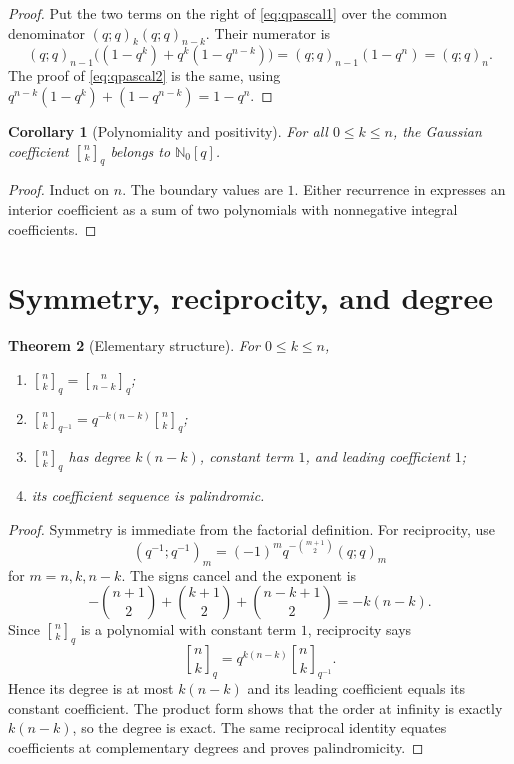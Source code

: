 \documentclass[11pt,oneside,openany]{book}
\newtheorem{theorem}{Theorem}[chapter]
\newtheorem{corollary}[theorem]{Corollary}
\theoremstyle{definition}
\theoremstyle{remark}
\newcommand{\qbinom}[2]{\genfrac{[}{]}{0pt}{}{#1}{#2}_{q}}
\newcommand{\Qbinom}[3]{\genfrac{[}{]}{0pt}{}{#1}{#2}_{#3}}
\newcommand{\N}{\mathbb N}
\begin{document}
\begin{proof}
Put the two terms on the right of \eqref{eq:qpascal1} over the common denominator $(q;q)_k(q;q)_{n-k}$.  Their numerator is
\[
 (q;q)_{n-1}\bigl((1-q^k)+q^k(1-q^{n-k})\bigr)
 =(q;q)_{n-1}(1-q^n)=(q;q)_n.
\]
The proof of \eqref{eq:qpascal2} is the same, using
\(
 q^{n-k}(1-q^k)+(1-q^{n-k})=1-q^n.
\)
\end{proof}

\begin{corollary}[Polynomiality and positivity]\label{cor:positivity}
For all $0\le k\le n$, the Gaussian coefficient $\qbinom nk$ belongs to $\N_0[q]$.
\end{corollary}

\begin{proof}
Induct on $n$.  The boundary values are $1$.  Either recurrence in  expresses an interior coefficient as a sum of two polynomials with nonnegative integral coefficients.
\end{proof}

\section{Symmetry, reciprocity, and degree}

\begin{theorem}[Elementary structure]\label{thm:qbinom-structure}
For $0\le k\le n$,
\begin{enumerate}[label=\textup{(\roman*)}]
\item $\qbinom nk=\qbinom n{n-k}$;
\item $\displaystyle \Qbinom nk{q^{-1}}=q^{-k(n-k)}\qbinom nk$;
\item $\qbinom nk$ has degree $k(n-k)$, constant term $1$, and leading coefficient $1$;
\item its coefficient sequence is palindromic.
\end{enumerate}
\end{theorem}

\begin{proof}
Symmetry is immediate from the factorial definition.  For reciprocity, use
\[
 (q^{-1};q^{-1})_m=(-1)^mq^{-\binom{m+1}{2}}(q;q)_m
\]
for $m=n,k,n-k$.  The signs cancel and the exponent is
\[
 -\binom{n+1}{2}+\binom{k+1}{2}+\binom{n-k+1}{2}=-k(n-k).
\]
Since $\qbinom nk$ is a polynomial with constant term $1$, reciprocity says
\[
 \qbinom nk=q^{k(n-k)}\Qbinom nk{q^{-1}}.
\]
Hence its degree is at most $k(n-k)$ and its leading coefficient equals its constant coefficient.  The product form shows that the order at infinity is exactly $k(n-k)$, so the degree is exact.  The same reciprocal identity equates coefficients at complementary degrees and proves palindromicity.
\end{proof}
\end{document}
